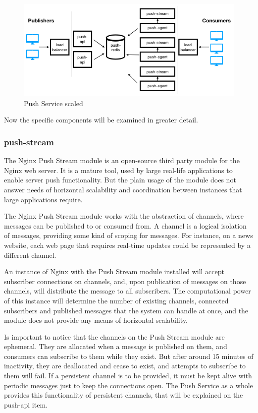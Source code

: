 \begin{figure}
	\caption{Push Service scaled}
	\label{fig:push-service-scaled}
	\centering%
	\includegraphics[width=\linewidth]{images/push-service-scaled.png}
\end{figure}

Now the specific components will be examined in greater detail.


\subsubsection{push-stream}

The Nginx Push Stream module is an open-source third party module for the Nginx web server. It is a mature tool, used by large real-life applications to enable server push functionality. But the plain usage of the module does not answer needs of horizontal scalability and coordination between instances that large applications require.

The Nginx Push Stream module works with the abstraction of channels, where messages can be published to or consumed from. A channel is a logical isolation of messages, providing some kind of scoping for messages. For instance, on a news website, each web page that requires real-time updates could be represented by a different channel.

An instance of Nginx with the Push Stream module installed will accept subscriber connections on channels, and, upon publication of messages on those channels, will distribute the message to all subscribers. The computational power of this instance will determine the number of existing channels, connected subscribers and published messages that the system can handle at once, and the module does not provide any means of horizontal scalability.

Is important to notice that the channels on the Push Stream module are ephemeral. They are allocated when a message is published on them, and consumers can subscribe to them while they exist. But after around 15 minutes of inactivity, they are deallocated and cease to exist, and attempts to subscribe to them will fail. If a persistent channel is to be provided, it must be kept alive with periodic messages just to keep the connections open. The Push Service as a whole provides this functionality of persistent channels, that will be explained on the push-api item.

